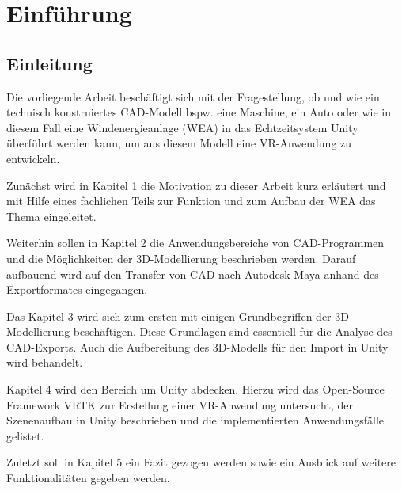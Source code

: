 \chapter{Einführung}
\section{Einleitung}
\label{sec:Einleitung}
Die vorliegende Arbeit beschäftigt sich mit der Fragestellung, ob und wie ein technisch konstruiertes CAD-Modell bspw. eine Maschine, ein Auto oder wie in diesem Fall eine Windenergieanlage (WEA) in das Echtzeitsystem Unity überführt werden kann, um aus diesem Modell eine VR-Anwendung zu entwickeln.
 
Zunächst wird in Kapitel 1 die Motivation zu dieser Arbeit kurz erläutert und mit Hilfe eines fachlichen Teils zur Funktion und zum Aufbau der WEA das Thema eingeleitet. 

Weiterhin sollen in Kapitel 2 die Anwendungsbereiche von CAD-Programmen und die Möglichkeiten der 3D-Modellierung beschrieben werden. Darauf aufbauend wird auf den Transfer von CAD nach Autodesk Maya anhand des Exportformates eingegangen.

Das Kapitel 3 wird sich zum ersten mit einigen Grundbegriffen der 3D-Modellierung beschäftigen. Diese Grundlagen sind essentiell für die Analyse des CAD-Exports. Auch die Aufbereitung des 3D-Modells für den Import in Unity wird behandelt.

Kapitel 4 wird den Bereich um Unity abdecken. Hierzu wird das Open-Source Framework VRTK zur Erstellung einer VR-Anwendung untersucht, der Szenenaufbau in Unity beschrieben und die implementierten Anwendungsfälle gelistet.

Zuletzt soll in Kapitel 5 ein Fazit gezogen werden sowie ein Ausblick auf weitere Funktionalitäten gegeben werden.

\newpage
